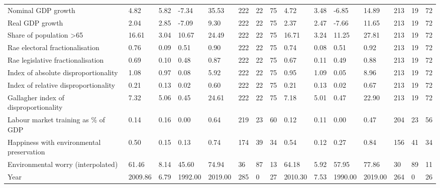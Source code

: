 \begin{longtable}{lllllllllllllll}
Nominal GDP growth & 4.82 & 5.82 & -7.34 & 35.53 & 222 & 22 & 75 & 4.72 & 3.48 & -6.85 & 14.89 & 213 & 19 & 72\\
Real GDP growth & 2.04 & 2.85 & -7.09 & 9.30 & 222 & 22 & 75 & 2.37 & 2.47 & -7.66 & 11.65 & 213 & 19 & 72\\
Share of population >65 & 16.61 & 3.04 & 10.67 & 24.49 & 222 & 22 & 75 & 16.71 & 3.24 & 11.25 & 27.81 & 213 & 19 & 72\\
\addlinespace
Rae electoral fractionalisation & 0.76 & 0.09 & 0.51 & 0.90 & 222 & 22 & 75 & 0.74 & 0.08 & 0.51 & 0.92 & 213 & 19 & 72\\
Rae legislative fractionalisation & 0.69 & 0.10 & 0.48 & 0.87 & 222 & 22 & 75 & 0.67 & 0.11 & 0.49 & 0.88 & 213 & 19 & 72\\
Index of absolute disproportionality & 1.08 & 0.97 & 0.08 & 5.92 & 222 & 22 & 75 & 0.95 & 1.09 & 0.05 & 8.96 & 213 & 19 & 72\\
Index of relative disproportionality & 0.21 & 0.13 & 0.02 & 0.60 & 222 & 22 & 75 & 0.21 & 0.13 & 0.02 & 0.67 & 213 & 19 & 72\\
Gallagher index of disproportionality & 7.32 & 5.06 & 0.45 & 24.61 & 222 & 22 & 75 & 7.18 & 5.01 & 0.47 & 22.90 & 213 & 19 & 72\\
\addlinespace
Labour market training as \% of GDP & 0.14 & 0.16 & 0.00 & 0.64 & 219 & 23 & 60 & 0.12 & 0.11 & 0.00 & 0.47 & 204 & 23 & 56\\
Happiness with environmental preservation & 0.50 & 0.15 & 0.13 & 0.74 & 174 & 39 & 34 & 0.54 & 0.12 & 0.27 & 0.84 & 156 & 41 & 34\\
Environmental worry (interpolated) & 61.46 & 8.14 & 45.60 & 74.94 & 36 & 87 & 13 & 64.18 & 5.92 & 57.95 & 77.86 & 30 & 89 & 11\\
Year & 2009.86 & 6.79 & 1992.00 & 2019.00 & 285 & 0 & 27 & 2010.30 & 7.53 & 1990.00 & 2019.00 & 264 & 0 & 26\\
\bottomrule
\end{longtable}
